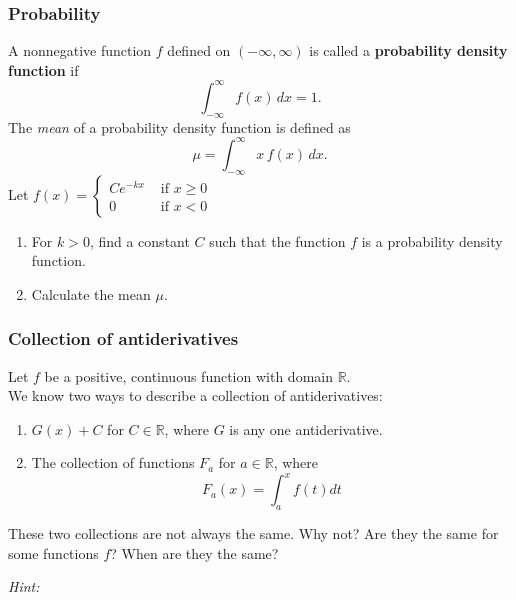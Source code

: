 \begin{frame}[t]
	\fontsize{13}{13}\selectfont
	\frametitle{Probability}

	\fontsize{13}{13}\selectfont
	\vspace{-2mm}

	A nonnegative function $f$ defined on $(-\infty,\infty)$ is called a {\bfseries probability density function }
	if
	\vspace{-2mm}
	\[
		\int_{-\infty}^{\infty}f(x)\, dx=1.
	\]
	The \emph{mean} of a probability density function is defined as
	\vspace{-2mm}
	\[
		\mu=\int_{-\infty}^{\infty}x \, f(x)\, dx.
	\]
	Let $\displaystyle f(x) =
	\begin{cases}
		Ce^{-kx} & \text{ if }x\geq 0 \\
		0        & \text{ if }x <0
	\end{cases}$
	\begin{enumerate}
		\item For $k>0$, find a constant $C$ such that the function $f$ is a
			probability density function.

		\item Calculate the mean $\mu$.
	\end{enumerate}
\end{frame}

\begin{frame}[t]
	\fontsize{13}{13}\selectfont
	\frametitle{Collection of antiderivatives}

	Let $\displaystyle f$ be a positive, continuous function with domain
	$\mathbb{R}$. \\ We know two ways to describe a collection of antiderivatives:
	\begin{enumerate}
		\item $\displaystyle G(x) + C$ for $C \in \mathbb{R}$, where $G$ is any one
			antiderivative.

		\item The collection of functions $\displaystyle F_{a}$ for $\displaystyle a
			\in \mathbb{R}$, where
			\[
				F_{a}(x) = \int_{a}^{x}f(t) dt
			\]
	\end{enumerate}

	These two collections are not always the same. Why not? Are they the same for some
	functions $f$? When are they the same?

	\vspace{2.5cm}
	\hfill \emph{Hint:} \quad \href{https://tinyurl.com/137antiderivatives}{}
\end{frame}

